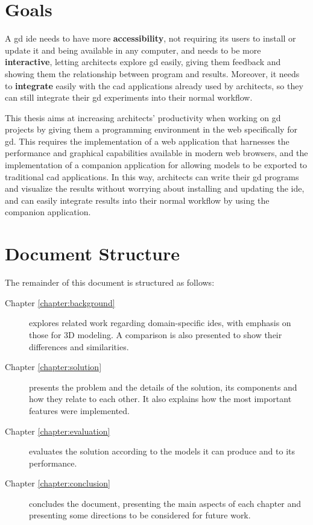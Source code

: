\section{Goals}
A \gls{gd} \gls{ide} needs to have more \textbf{accessibility}, not requiring its users to install or update it and being available in any computer, and needs to be more \textbf{interactive}, letting architects explore \gls{gd} easily, giving them feedback and showing them the relationship between program and results.
Moreover, it needs to \textbf{integrate} easily with the \gls{cad} applications already used by architects, so they can still integrate their \gls{gd} experiments into their normal workflow.

This thesis aims at increasing architects' productivity when working on \gls{gd} projects by giving them a programming environment in the web specifically for \gls{gd}.
This requires the implementation of a web application that harnesses the performance and graphical capabilities available in modern web browsers, and the implementation of a companion application for allowing models to be exported to traditional \gls{cad} applications.
In this way, architects can write their \gls{gd} programs and visualize the results without worrying about installing and updating the \gls{ide}, and can easily integrate results into their normal workflow by using the companion application.


\section{Document Structure}
The remainder of this document is structured as follows:
\begin{description}
  \item[Chapter \ref{chapter:background}] explores related work regarding domain-specific \glspl{ide}, with emphasis on those for 3D modeling. A comparison is also presented to show their differences and similarities.
  \item[Chapter \ref{chapter:solution}] presents the problem and the details of the solution, its components and how they relate to each other. It also explains how the most important features were implemented.
  \item[Chapter \ref{chapter:evaluation}] evaluates the solution according to the models it can produce and to its performance.
  \item[Chapter \ref{chapter:conclusion}] concludes the document, presenting the main aspects of each chapter and presenting some directions to be considered for future work.
\end{description}



